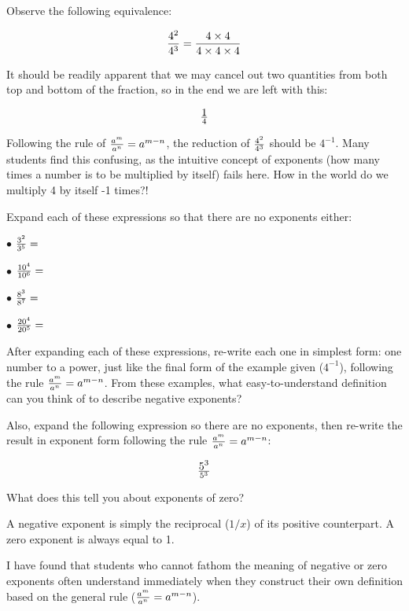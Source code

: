 

Observe the following equivalence:

$${4^2 \over 4^3} = {{4 \times 4} \over {4 \times 4 \times 4}}$$

It should be readily apparent that we may cancel out two quantities from both top and bottom of the fraction, so in the end we are left with this:

$$1 \over 4$$

Following the rule of ${a^m \over a^n} = a^{m-n}$, the reduction of ${4^2 \over 4^3}$ should be $4^{-1}$.  Many students find this confusing, as the intuitive concept of exponents (how many times a number is to be multiplied by itself) fails here.  How in the world do we multiply 4 by itself -1 times?!

\vskip 10pt

Expand each of these expressions so that there are no exponents either:

\vskip 10pt
\goodbreak
\item{$\bullet$} ${3^2 \over 3^5} = $
\vskip 10pt
\item{$\bullet$} ${10^4 \over 10^6} = $
\vskip 10pt
\item{$\bullet$} ${8^3 \over 8^7} = $
\vskip 10pt
\item{$\bullet$} ${20^4 \over 20^5} = $
\vskip 10pt

After expanding each of these expressions, re-write each one in simplest form: one number to a power, just like the final form of the example given ($4^{-1}$), following the rule ${a^m \over a^n} = a^{m-n}$.  From these examples, what easy-to-understand definition can you think of to describe negative exponents?

Also, expand the following expression so there are no exponents, then re-write the result in exponent form following the rule ${a^m \over a^n} = a^{m-n}$:

$$5^3 \over 5^3$$

What does this tell you about exponents of zero?







A negative exponent is simply the reciprocal ($1/x$) of its positive counterpart.  A zero exponent is always equal to 1.







I have found that students who cannot fathom the meaning of negative or zero exponents often understand immediately when they construct their own definition based on the general rule (${a^m \over a^n} = a^{m-n}$).




